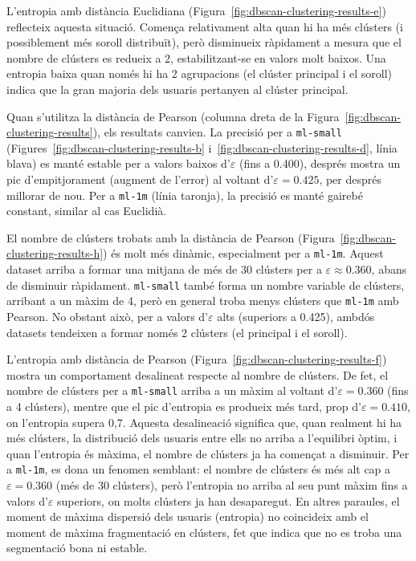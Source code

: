 \documentclass[a4paper,12pt]{report}
\begin{document}
L'entropia amb distància Euclidiana (Figura~\ref{fig:dbscan-clustering-results-e}) reflecteix aquesta situació. Comença relativament alta quan hi ha més clústers (i possiblement més soroll distribuït), però disminueix ràpidament a mesura que el nombre de clústers es redueix a 2, estabilitzant-se en valors molt baixos. Una entropia baixa quan només hi ha 2 agrupacions (el clúster principal i el soroll) indica que la gran majoria dels usuaris pertanyen al clúster principal.

Quan s'utilitza la distància de Pearson (columna dreta de la Figura~\ref{fig:dbscan-clustering-results}), els resultats canvien. La precisió per a \texttt{ml-small} (Figures~\ref{fig:dbscan-clustering-results-b} i~\ref{fig:dbscan-clustering-results-d}, línia blava) es manté estable per a valors baixos d'\(\varepsilon\) (fins a 0.400), després mostra un pic d'empitjorament (augment de l'error) al voltant d'\(\varepsilon=0.425\), per després millorar de nou. Per a \texttt{ml-1m} (línia taronja), la precisió es manté gairebé constant, similar al cas Euclidià.

El nombre de clústers trobats amb la distància de Pearson (Figura~\ref{fig:dbscan-clustering-results-h}) és molt més dinàmic, especialment per a \texttt{ml-1m}. Aquest dataset arriba a formar una mitjana de més de 30 clústers per a \(\varepsilon \approx 0.360\), abans de disminuir ràpidament. \texttt{ml-small} també forma un nombre variable de clústers, arribant a un màxim de 4, però en general troba menys clústers que \texttt{ml-1m} amb Pearson. No obstant això, per a valors d'\(\varepsilon\) alts (superiors a 0.425), ambdós datasets tendeixen a formar només 2 clústers (el principal i el soroll).

L’entropia amb distància de Pearson (Figura~\ref{fig:dbscan-clustering-results-f}) mostra un comportament desalineat respecte al nombre de clústers. De fet, el nombre de clústers per a \texttt{ml-small} arriba a un màxim al voltant d’\(\varepsilon=0.360\) (fins a 4 clústers), mentre que el pic d’entropia es produeix més tard, prop d’\(\varepsilon=0.410\), on l’entropia supera 0,7. Aquesta desalineació significa que, quan realment hi ha més clústers, la distribució dels usuaris entre ells no arriba a l’equilibri òptim, i quan l’entropia és màxima, el nombre de clústers ja ha començat a disminuir. Per a \texttt{ml-1m}, es dona un fenomen semblant: el nombre de clústers és més alt cap a \(\varepsilon=0.360\) (més de 30 clústers), però l’entropia no arriba al seu punt màxim fins a valors d’\(\varepsilon\) superiors, on molts clústers ja han desaparegut. En altres paraules, el moment de màxima dispersió dels usuaris (entropia) no coincideix amb el moment de màxima fragmentació en clústers, fet que indica que no es troba una segmentació bona ni estable.
\end{document}
